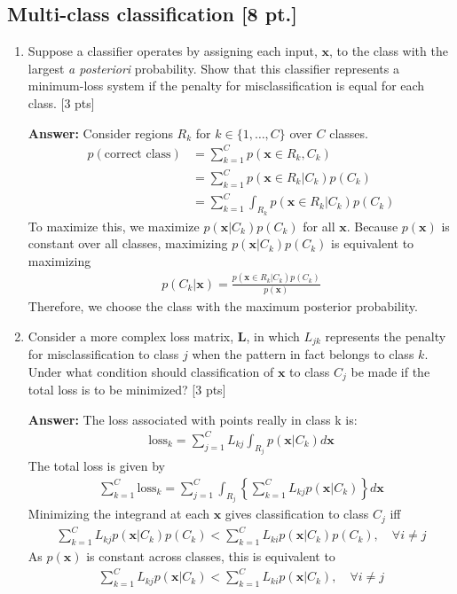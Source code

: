 \documentclass[12pt,letterpaper]{article}
\begin{document}
\subsection{Multi-class classification [8 pt.]}

\begin{enumerate}
\item Suppose a classifier operates by assigning each input, $\mathbf{x}$, to
the class with the largest \textit{a posteriori} probability. Show that this
classifier represents a minimum-loss system if the penalty for
misclassification is equal for each class. [3 pts]

{\color{red} 
\textbf{Answer: }
Consider regions $R_k$ for $k \in \{1, \dots, C\}$ over $C$ classes.
\begin{align*}
  p(\text{correct class}) &= \sum_{k=1}^C p(\mathbf{x}\in R_k, C_k) \\
                          &=\sum_{k=1}^C p(\mathbf{x}\in R_k|C_k) p(C_k) \\
  &=\sum_{k=1}^C \int_{R_k}p(\mathbf{x}\in R_k|C_k) p(C_k)
\end{align*}
To maximize this, we maximize $p(\mathbf{x}|C_k)p(C_k)$ for all $\mathbf{x}$. Because $p(\mathbf{x})$ is constant over all classes, maximizing $p(\mathbf{x}|C_k)p(C_k)$ is equivalent to maximizing
\begin{align*}
  p(C_k|\mathbf{x}) =  \frac{p(\mathbf{x}\in R_k|C_k) p(C_k)}{p(\mathbf{x})}
\end{align*}
Therefore, we choose the class with the maximum posterior probability.
}

\item Consider a more complex loss matrix, $\mathbf{L}$, in which $L_{jk}$
represents the penalty for misclassification to class $j$ when the pattern in
fact belongs to class $k$. Under what condition should classification of
$\mathbf{x}$ to class $C_j$ be made if the total loss is to be minimized? [3
pts]

{\color{red} 
\textbf{Answer: }
The loss associated with points really in class k is:
\begin{gather*}
  \text{loss}_k = \sum_{j=1}^C L_{kj}\int_{R_j}p(\mathbf{x}|C_k) d\mathbf{x}
\end{gather*}
The total loss is given by
\begin{gather*}
  \sum_{k=1}^C \text{loss}_k = \sum_{j=1}^C\int_{R_j} \left\{ \sum_{k=1}^C  L_{kj}p(\mathbf{x}|C_k)\right\} d\mathbf{x}
\end{gather*}
Minimizing the integrand at each $\mathbf{x}$ gives classification to class $C_j$ iff
\begin{gather*}
  \sum_{k=1}^C  L_{kj}p(\mathbf{x}|C_k)p(C_k) < \sum_{k=1}^C  L_{ki}p(\mathbf{x}|C_k)p(C_k), \quad \forall i\ne j
\end{gather*}
As $p(\mathbf{x})$ is constant across classes, this is equivalent to
\begin{gather*}
  \sum_{k=1}^C  L_{kj}p(\mathbf{x}|C_k) < \sum_{k=1}^C  L_{ki}p(\mathbf{x}|C_k), \quad \forall i\ne j
\end{gather*}
}


\end{enumerate}
\end{document}
